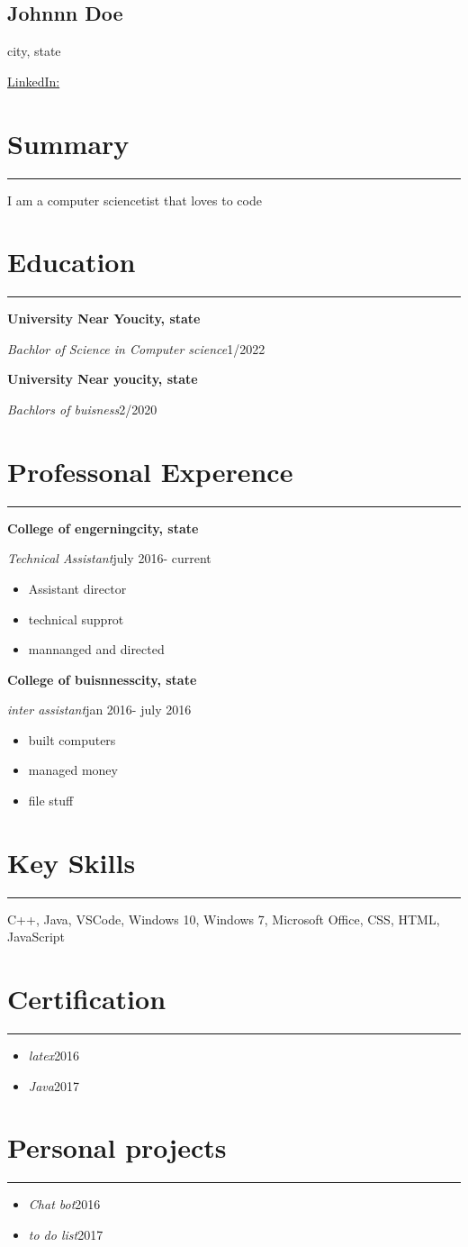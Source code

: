 \documentclass[11pt]{article}%
\newcommand{\resumesection}[1]{\vspace{-0.5cm}\section*{\color{highlight}#1}\vspace{-0.2cm}\hrule\vspace{0.2cm}}%
\newcommand{\location}[1]{\begin{center}\vspace{-0.1cm}#1\vspace{-0.3cm}\end{center}}%
\newcommand{\name}[1]{\begin{center}\section*{\LARGE \color{highlight}#1}\vspace{-0.8cm}\end{center}}%
\begin{document}
%
\normalsize%
\name{Johnnn Doe}%
\location{city, state}%
\begin{center}%
\href{mailto:email@domain}{}%
\vspace*{0.1cm}%
%
\vspace*{0.1cm}%
\href{https://www.linkedin.com/in/}{LinkedIn: }%
\end{center}%
\resumesection{Summary}%
I am a computer sciencetist that loves to code%
\resumesection{Education}%
\textbf{University Near You}{\textbf{\hfill {city, state}}}%
\par%
\textit{Bachlor of Science in Computer science}{\hfill {1/2022}}%
\par%
\textbf{University Near you}{\textbf{\hfill {city, state}}}%
\par%
\textit{Bachlors of buisness}{\hfill {2/2020}}%
\par%
\resumesection{Professonal Experence}%
\textbf{College of engerning}{\textbf{\hfill{city, state}}}%
\par%
\textit{Technical Assistant}{\hfill{july 2016{-} current}}%
\begin{itemize}%
\item%
Assistant director%
\item%
technical supprot%
\item%
mannanged and directed%
\end{itemize}%
\textbf{College of buisnness}{\textbf{\hfill{city, state}}}%
\par%
\textit{inter assistant}{\hfill{jan 2016{-} july 2016}}%
\begin{itemize}%
\item%
built computers%
\item%
managed money%
\item%
file stuff%
\end{itemize}%
\resumesection{Key Skills}%
C++, Java, VSCode, Windows 10, Windows 7, Microsoft Office, CSS, HTML, JavaScript%
\resumesection{Certification}%
\begin{itemize}%
\item%
\textit{latex}{\hfill{2016}}%
\item%
\textit{Java}{\hfill{2017}}%
\end{itemize}%
\resumesection{Personal projects}%
\begin{itemize}%
\item%
\textit{Chat bot}{\hfill{2016}}%
\item%
\textit{to do list}{\hfill{2017}}%
\end{itemize}%
\end{document}

